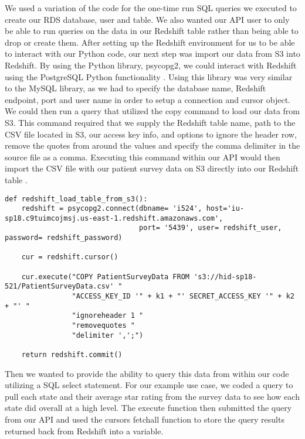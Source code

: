 We used a variation of the code for the one-time run SQL queries we executed to create our RDS database, user and table. We also wanted our API user to only be able to run queries on the data in our Redshift table rather than being able to drop or create them. After setting up the Redshift environment for us to be able to interact with our Python code, our next step was import our data from S3 into Redshift. By using the Python library, psycopg2, we could interact with Redshift using the PostgreSQL Python functionality \cite{hid-sp18-521-redshift-postgreSQL}. Using this library was very similar to the MySQL library, as we had to specify the database name, Redshift endpoint, port and user name in order to setup a connection and cursor object. We could then run a query that utilized the copy command to load our data from S3. This command required that we supply the Redshift table name, path to the CSV file located in S3, our access key info, and options to ignore the header row, remove the quotes from around the values and specify the comma delimiter in the source file as a comma. Executing this command within our API would then import the CSV file with our patient survey data on S3 directly into our Redshift table \cite{hid-sp18-521-redshift-gettingstarted}.  

\begin{verbatim}
def redshift_load_table_from_s3():
    redshift = psycopg2.connect(dbname= 'i524', host='iu-sp18.c9tuimcojmsj.us-east-1.redshift.amazonaws.com',
                                port= '5439', user= redshift_user, password= redshift_password)

    cur = redshift.cursor()

    cur.execute("COPY PatientSurveyData FROM 's3://hid-sp18-521/PatientSurveyData.csv' "
                "ACCESS_KEY_ID '" + k1 + "' SECRET_ACCESS_KEY '" + k2 + "' "
                "ignoreheader 1 "
                "removequotes "
                "delimiter ',';")

    return redshift.commit()
\end{verbatim}	

Then we wanted to provide the ability to query this data from within our code utilizing a SQL select statement. For our example use case, we coded a query to pull each state and their average star rating from the survey data to see how each state did overall at a high level. The execute function then submitted the query from our API and used the cursors fetchall function to store the query results returned back from Redshift into a variable. 

